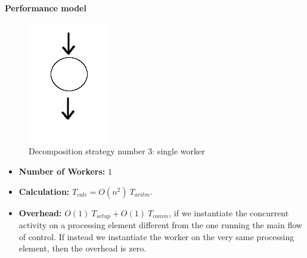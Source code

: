 \documentclass{article}
\begin{document}
\paragraph{Performance model} 

\begin{figure}[h]
\centering
\includegraphics[scale=0.43]{single_worker_p3}
\caption{Decomposition strategy number 3: single worker}
\label{fig:worker}
\end{figure} 

\begin{itemize}
\item \textbf{Number of Workers:} $1$
\item \textbf{Calculation:} $T_{calc} = O(n^{2}) \: T_{aritm}$. 
\item \textbf{Overhead:} $O(1) \: T_{setup} + O(1)  \: T_{comm}$, if we instantiate the concurrent activity on a processing element different from the one running the main flow of control. If instead we instantiate the worker on the very same processing element, then the overhead is zero.
\end{itemize}
\end{document}
